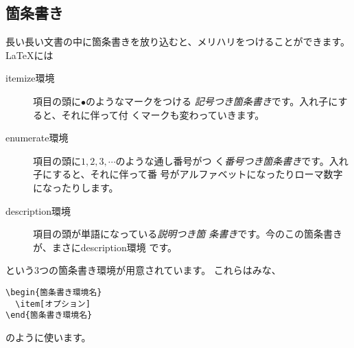 \subsection{箇条書き}
長い長い文書の中に箇条書きを放り込むと、メリハリをつけることができます。
{\LaTeX}には
\begin{description}
 \item[itemize環境] 項目の頭に$\bullet$のようなマークをつける
	    \emph{記号つき箇条書き}です。入れ子にすると、それに伴って付
	    くマークも変わっていきます。
 \item[enumerate環境] 項目の頭に$1,2,3,\cdots$のような通し番号がつ
	    く\emph{番号つき箇条書き}です。入れ子にすると、それに伴って番
	    号がアルファベットになったりローマ数字になったりします。
 \item[description環境] 項目の頭が単語になっている\emph{説明つき箇
	    条書き}です。今のこの箇条書きが、まさにdescription環境
	    です。
\end{description}
という3つの箇条書き環境が用意されています。
これらはみな、
\begin{screen}
\begin{verbatim}
\begin{箇条書き環境名}
  \item[オプション]
\end{箇条書き環境名}
\end{verbatim}
\end{screen}
のように使います。

